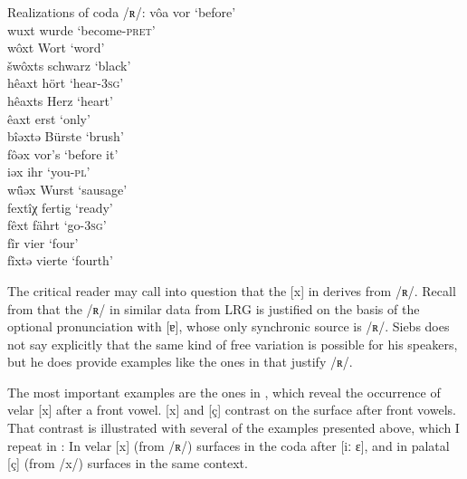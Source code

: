 \ea%
\label{ex:5:30}
Realizations of coda /ʀ/:
\ea\label{ex:5:30a} 
vôa  \tab   [foːɐ] \tab vor \tab ‘before’ \\
\ex\label{ex:5:30b}
wuxt   \tab [bʊxt]    \tab wurde   \tab ‘become-\textsc{pret}’ \\
wôxt   \tab [boːxt]   \tab Wort    \tab ‘word’                 \\
šwôxts \tab [ʃboːxt]  \tab schwarz \tab ‘black’                \\
hêaxt  \tab [heːɑxt]  \tab hört   \tab ‘hear-\textsc{3sg}’    \\
hêaxts \tab [heːɑxts] \tab Herz   \tab ‘heart’  \\
êaxt   \tab [eːɑxt]   \tab erst   \tab ‘only’   \\
bîəxtə \tab [biːəxtə] \tab Bürste \tab ‘brush’  \\

\ex\label{ex:5:30c} 
fôəx     \tab [foːəx] \tab vor’s  \tab ‘before it’        \\
iəx     \tab [iəx]   \tab ihr    \tab  ‘you-\textsc{pl}’ \\
w\^{ü}əx \tab [byːəx] \tab Wurst  \tab ‘sausage’          \\

\ex\label{ex:5:30d}
fextîχ  \tab  [fɛxtiːç] \tab fertig \tab ‘ready’             \\
fêxt    \tab  [feːxt]   \tab fährt  \tab ‘go-\textsc{3sg}’ \\

\ex\label{ex:5:30e}
fîr    \tab   [fiːʀ]   \tab vier   \tab ‘four’    \\
fîxtə  \tab   [fiːxtə] \tab vierte \tab ‘fourth’ \\
\z
\z 

The critical reader may call into question that the [x] in  derives from /ʀ/. Recall from  that the /ʀ/ in similar data from LRG is justified on the basis of the optional pronunciation with [ɐ], whose only synchronic source is /ʀ/. Siebs does not say explicitly that the same kind of free variation is possible for his speakers, but he does provide examples like the ones in  that justify /ʀ/.

The most important examples are the ones in , which reveal the occurrence of velar [x] after a front vowel.  [x] and [ç] contrast on the surface after front vowels. That contrast is illustrated with several of the examples presented above, which I repeat in : In  velar [x] (from /ʀ/) surfaces in the coda after [iː ɛ], and in  palatal [ç] (from /x/) surfaces in the same context.

